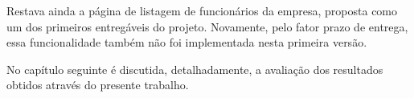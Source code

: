 Restava ainda a página de listagem de funcionários da empresa, proposta como um dos primeiros entregáveis do projeto. Novamente, pelo fator prazo de entrega, essa funcionalidade também não foi implementada nesta primeira versão.

No capítulo seguinte é discutida, detalhadamente, a avaliação dos resultados obtidos através do presente trabalho.
